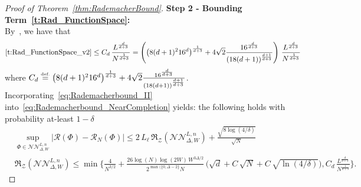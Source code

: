 \documentclass{article}
\numberwithin{equation}{section}
\theoremstyle{definition}
\newcommand{\eqdef}{\ensuremath{\stackrel{\mbox{\upshape\tiny def.}}{=}}}
\begin{document}
\begin{proof}[{Proof of Theorem~\ref{thm:RademacherBound}}]
\noindent \textbf{Step 2 - Bounding Term~\eqref{t:Rad_FunctionSpace}:}\hfill\\
By~\cite[Lemma 25]{HouKratsios_JMLR_2023}, we have that
\begin{equation}
\label{eq:Rademacherbound_II}
\eqref{t:Rad_FunctionSpace_v2}
\le 
    C_d\,\frac{L^{\frac{d}{d+3}}}{N^{\frac{1}{d+3}}}
= 
 \left(
    \big(8(d+1)^2 16^d\big)^{\frac{1}{d+3}} + 4\sqrt{2} \frac{16^{\frac{d}{d+3}}}{(18(d+1))^{\frac{d+1}{d+3}}}
\right)
\,\frac{L^{\frac{d}{d+3}}}{N^{\frac{1}{d+3}}}
\end{equation}
where $C_d\eqdef \big(8(d+1)^2 16^d\big)^{\frac{1}{d+3}} + 4\sqrt{2} \frac{16^{\frac{d}{d+3}}}{(18(d+1))^{\frac{d+1}{d+3}}}$. 
Incorporating~\eqref{eq:Rademacherbound_II} into~\eqref{eq:Rademacherbound_NearCompletion} yields: the following holds with probability at-least $1-\delta$
\begin{equation*}
\begin{aligned}
&
    \sup_{\Phi\in \mathcal{NN}_{\Delta,W}^{L,n}} 
        \big|\mathcal{R}(\Phi)-\mathcal{R}_N(\Phi)\big|
    \le 
        2\,L_{\ell}\,\mathfrak{R}_{\mathcal{Z}}(\mathcal{NN}_{\Delta,W}^{L,n})
        +
        \frac{
            \sqrt{8\log(4/\delta)}
        }{
            \sqrt{N}
        }
\\
&
     \mathfrak{R}_{\mathcal{Z}}(\mathcal{NN}_{\Delta,W}^{L,n})
\le 
    \min\biggl\{
            \frac{4}{N^{3/2}}
            +
            \frac{
                26\log(N)\log(2W)
                \,
                W^{3\Delta/2}
            }{
                2^{\max(\{0,\Delta-2\}}
                N
            }
            \,
            \big(
                \sqrt{d}
                +
                C\,\sqrt{N}
                +
                C\,\sqrt{\ln(4/\delta)}
            \big)
    ,
            C_d\,\frac{L^{\frac{d}{d+3}}}{N^{\frac{1}{d+3}}}
    \biggr\}
.
\end{aligned}
\end{equation*}
\end{proof}
\end{document}
